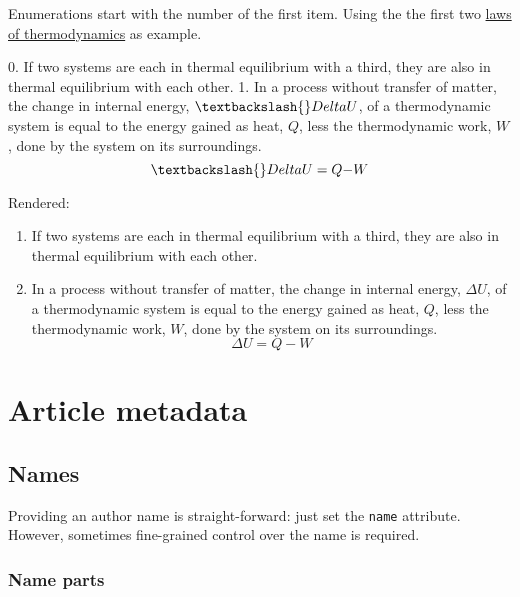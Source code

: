 \documentclass[10pt,a4paper,onecolumn]{article}
\newenvironment{Shaded}{}{}
\newcommand{\NormalTok}[1]{#1}
\newcommand{\SpecialStringTok}[1]{\textcolor[rgb]{0.73,0.40,0.53}{#1}}
\providecommand{\tightlist}{%
  \setlength{\itemsep}{0pt}\setlength{\parskip}{0pt}}
\begin{document}
Enumerations start with the number of the first item. Using the the
first two
\href{https://en.wikipedia.org/wiki/Laws_of_thermodynamics}{laws of
thermodynamics} as example.

\begin{Shaded}
\begin{Highlighting}[]
\SpecialStringTok{0. }\NormalTok{If two systems are each in thermal equilibrium with a third, they are}
\NormalTok{   also in thermal equilibrium with each other.}
\SpecialStringTok{1. }\NormalTok{In a process without transfer of matter, the change in internal}
\NormalTok{   energy, $\textbackslash{}Delta U$, of a thermodynamic system is equal to the energy}
\NormalTok{   gained as heat, $Q$, less the thermodynamic work, $W$, done by the}
\NormalTok{   system on its surroundings. $$\textbackslash{}Delta U = Q {-} W$$}
\end{Highlighting}
\end{Shaded}

Rendered:

\begin{enumerate}
\def\labelenumi{\arabic{enumi}.}
\setcounter{enumi}{-1}
\tightlist
\item
  If two systems are each in thermal equilibrium with a third, they are
  also in thermal equilibrium with each other.
\item
  In a process without transfer of matter, the change in internal
  energy, \(\Delta U\), of a thermodynamic system is equal to the energy
  gained as heat, \(Q\), less the thermodynamic work, \(W\), done by the
  system on its surroundings. \[\Delta U = Q - W\]
\end{enumerate}

\section{Article metadata}\label{article-metadata}

\subsection{Names}\label{names}

Providing an author name is straight-forward: just set the \texttt{name}
attribute. However, sometimes fine-grained control over the name is
required.

\subsubsection{Name parts}\label{name-parts}
\end{document}
